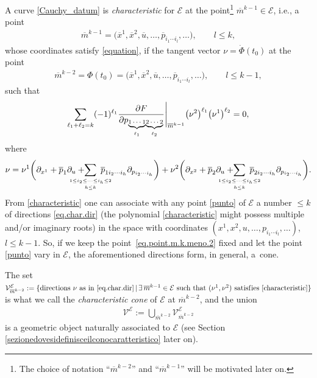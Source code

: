 \documentclass[pdftex]{sigma}
\newcommand{\M}{\mathcal{V}}
\newcommand{\E}{\mathcal{E}}
\newcommand{\w}{\nu}
\numberwithin{equation}{section}
\begin{document}
A curve \eqref{Cauchy_datum} is \emph{characteristic} for $\E$ at the point\footnote{The choice of notation ``$\overline{m}^{k-2}$'' and ``$\overline{m}^{k-1}$'' will be motivated later on.} $\overline{m}^{k-1}\in\E$, i.e., a point
\begin{gather}\label{punto}
\overline{m}^{k-1}=\big(\overline{x}^{1},\overline{x}^{2},\overline{u},\dots ,\overline{p}_{i_1\cdots i_{l}},\dots\big),\qquad l\leq k,
 \end{gather}
whose coordinates satisfy \eqref{equation},
 if the tangent vector $\w=\dot{\Phi}(t_0)$ at the point
\begin{gather}\label{eq.point.m.k.meno.2}
\overline{m}^{k-2}=\Phi(t_0)=\big(\overline{x}^{1},\overline{x}^{2},\overline
{u},\dots,\overline{p}_{i_1\cdots i_{l}},\dots\big),\qquad l\leq k-1,
\end{gather}
 such that
\begin{gather}\label{characteristic}
\sum_{\ell_1+\ell_2=k} (-1)^{\ell_1} \frac{\partial F}{\partial p_{{\underbrace{\mbox{\scriptsize $1\cdots 1$}}_{\ell_1}}{\underbrace{\mbox{\scriptsize $2\cdots 2$}}_{\ell_2}}}} \Bigg|_{\overline{m}^{k-1}}\big(\w^2\big)^{\ell_1}\big(\w^1\big)^{\ell_2}= 0,
\end{gather}
where
\begin{gather}\label{eq.char.dir}
\w=\w^1\bigg({\partial}_{x^{1}}+\overline{p}_{1}\partial_{u}+\hspace{-7mm}\sum_{\underset{ h\leq k}{\scriptscriptstyle 1\leq i_2\leq\dots\leq i_h\leq 2}}\hspace{-5mm}\overline
{p}_{1i_2\cdots i_h}\partial_{p_{i_2\cdots i_{h}}}\bigg)
+
\w^2\bigg({\partial}_{x^{2}}+\overline{p}_{2}\partial_{u}+\hspace{-7mm}\sum_{\underset{h\leq k}{\scriptscriptstyle 1\leq i_2\leq\dots\leq i_h\leq 2}}\hspace{-5mm}\overline
{p}_{2i_2\cdots i_h}\partial_{p_{i_2\cdots i_{h}}}\bigg).
\end{gather}
From \eqref{characteristic}
one can associate with any point \eqref{punto} of $\E$ a number $\leq k$ of
directions \eqref{eq.char.dir} (the polynomial \eqref{characteristic} might possess multiple and/or imaginary roots) in the space with coordinates $(x^1,x^2,u,\dots,p_{i_1\cdots i_l},\dots)$, $l\leq k-1$. So, if we keep the point~\eqref{eq.point.m.k.meno.2} f\/ixed and let the point \eqref{punto} vary in $\E$, the aforementioned directions form, in general, a~cone.

The set $ \M^\E_{\overline{m}^{k-2}}:=\{\textrm{directions $\w$ as in \eqref{eq.char.dir}}\,|\,\exists\, \overline{m}^{k-1}\in\E \textrm{ such that $(\w^1,\w^2)$ satisf\/ies \eqref{characteristic}}\}$ is what we call the \emph{characteristic cone} of $\E$ at $\overline{m}^{k-2}$, and
the union
\begin{gather}\label{eq.char.cone.1}
\M^\E:=\bigcup_{\overline{m}^{k-2}} \M^\E_{\overline{m}^{k-2}}
\end{gather}
is a geometric object naturally associated to $\E$ (see Section \ref{sezionedovesidefinisceilconocaratteristico} later on).
\end{document}
